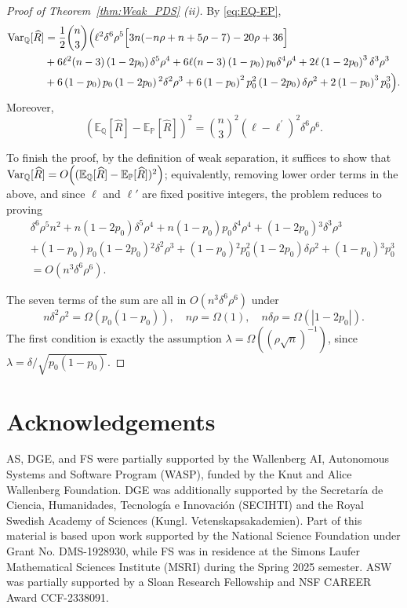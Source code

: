 \documentclass[11pt, letterpaper]{article}
\numberwithin{equation}{section}
\newcommand{\E}{\mathbb{E}}
\begin{document}
\begin{proof}[Proof of Theorem~\ref{thm:Weak_PDS} \textnormal{(ii)}]
\noindent By \eqref{eq:EQ-EP}, 
\begin{align*}
{\rm Var}_\mathbb{Q}[\widehat{R}] &=\frac{1}{2} \binom{n}{3}\Big( \ell^2 \delta ^6 \rho ^5 \Big[3 n (-n\rho +n+5 \rho -7)-20 \rho +36\Big]\\ 
&+ 6\ell^2 (n-3) \left(1- 2 p_0\right) \delta ^5 \rho ^4+ 6 \ell (n-3) \left(1-p_0\right) p_0 \delta ^4 \rho ^4+ 2\ell \left(1- 2 p_0\right)^3 \delta ^3 \rho ^3\\
   &+ 6 \left(1-p_0\right) p_0 \left(1-2 p_0\right){}^2 \delta ^2 \rho ^3+ 6 \left(1-p_0\right)^2 p_0^2 \left(1- 2 p_0\right) \delta  \rho ^2+ 2\left(1-p_0\right)^3 p_0^3\Big).
\end{align*}
Moreover, 
\[
(\mathbb{E}_{\mathbb Q}[\widehat{R}] -\mathbb{E}_\mathbb P[\widehat{R}])^2 = 
\binom{n}{3}^2(\ell-\ell^\prime)^{2}\delta^6\rho^6.
\]

\noindent To finish the proof, by the definition of weak separation, it suffices to show that ${\rm Var}_\mathbb{Q}[\widehat{R}] = O\Big((\E_\mathbb Q[\widehat{R}] - \E_\mathbb P[\widehat{R}])^2\Big)$; equivalently, removing lower order terms in the above, and since $\ell$ and $\ell'$ are fixed positive integers, the problem reduces to proving
%
\begin{eqnarray*}
   &&\delta ^6 \rho ^5 n^2+ n \left(1- 2 p_0\right) \delta ^5 \rho ^4+ n \left(1-p_0\right) p_0 \delta ^4 \rho ^4+ \left(1- 2 p_0\right){}^3 \delta ^3 \rho ^3\\
   &&+ \left(1-p_0\right) p_0 \left(1-2 p_0\right){}^2 \delta ^2 \rho ^3+\left(1-p_0\right){}^2 p_0^2 \left(1- 2 p_0\right) \delta  \rho ^2+\left(1-p_0\right){}^3 p_0^3\\
   &&= O(n^3 \delta ^6 \rho^6).
\end{eqnarray*}

\noindent The seven terms of the sum are all in $O(n^3 \delta ^6 \rho^6)$ under
\[
n\delta^2 \rho^2 = \Omega(p_0(1-p_0)), \quad 
n\rho = \Omega(1), \quad
n\delta \rho = \Omega(|1-2p_0|). 
\]
The first condition is exactly the assumption
$\lambda=\Omega((\rho\sqrt n)^{-1})$, since $\lambda=\delta/\sqrt{p_0(1-p_0)}$.
\end{proof}

%




\section*{Acknowledgements}
AS, DGE, and FS were partially supported by the Wallenberg AI,
Autonomous Systems and Software Program (WASP), funded by the Knut and Alice
Wallenberg Foundation. DGE was additionally supported by the Secretaría de Ciencia, Humanidades, Tecnología e Innovación (SECIHTI) and the Royal Swedish Academy of Sciences (Kungl. Vetenskapsakademien). Part of this material is based upon work supported by the National Science Foundation under Grant No. DMS-1928930, while FS was in residence at the Simons Laufer Mathematical Sciences Institute (MSRI) during the Spring 2025 semester. ASW was partially supported by a Sloan Research Fellowship and NSF CAREER Award CCF-2338091. 
\end{document}
